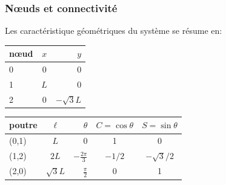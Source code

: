 \documentclass{beamer}
\begin{document}
\begin{frame}
\frametitle{Nœuds et connectivité}
Les caractéristique géométriques du système se résume en:\\
\begin{center}
\begin{tabular}{|l|c|r|}
  \hline
  nœud & $x$  & $y$ \\
  \hline
  0 & 0 & 0 \\
  1& $L$& 0 \\
  2& 0 & $-\sqrt 3 L$ \\
  \hline
\end{tabular} 
\end{center}

\begin{center}
  \begin{tabular}{|l|c|r|c|c|}
  \hline
  poutre & $\ell$  & $\theta$ & $C=\cos\theta$ & $S=\sin\theta$\\
  \hline
  (0,1) & $L$ & 0 & 1 & 0 \\
  (1,2)& $2L$& $-\frac{2\pi}{3}$&$-1/2$&$-\sqrt 3/2 $\\
  (2,0)& $\sqrt 3L$ &$\frac{\pi}{2}$ &0 &1 \\
  \hline
\end{tabular}
\end{center}

\end{frame}
\end{document}
